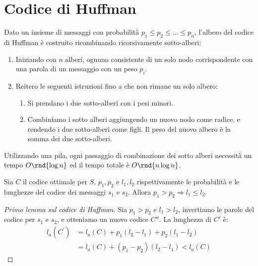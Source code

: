 \documentclass[\main/main.tex]{subfiles}
\begin{document}
\section{Codice di Huffman}
\begin{multicols}{2}
\begin{definition}
    Dato un insieme di messaggi con probabilità \(p_1 \leq p_2 \leq \ldots \leq p_n\), l'albero del codice di Huffman è costruito ricombinando ricorsivamente sotto-alberi:
    \begin{enumerate}
        \item Iniziando con \(n\) alberi, ognuno consistente di un solo nodo corrispondente con una parola di un messaggio con un peso \(p_i\).
        \item Reitero le seguenti istruzioni fino a che non rimane un solo albero:
        \begin{enumerate}
            \item Si prendano i due sotto-alberi con i pesi minori.
            \item Combiniamo i sotto alberi aggiungendo un nuovo nodo come radice, e rendendo i due sotto-alberi come figli. Il peso del nuovo albero è la somma dei due sotto-alberi.
        \end{enumerate}
    \end{enumerate}
\end{definition}
\begin{complexity}
    Utilizzando una pila, ogni passaggio di combinazione dei sotto alberi necessità un tempo \(O\rnd{\log n}\) ed il tempo totale è \(O\rnd{n \log n}\).
\end{complexity}
\begin{lemma}
    Sia \(C\) il codice ottimale per \(S\), \(p_1, p_2\) e \(l_1, l_2\) rispettivamente le probabilità e le lunghezze del codice dei messaggi \(s_1\) e \(s_2\). Allora \(p_1 > p_2 \Rightarrow l_1 \leq l_2\).
\end{lemma}
\begin{proof}[Primo lemma sul codice di Huffman]
    Sia \(p_1 > p_2\) e \(l_1>l_2\), invertiamo le parole del codice per \(s_1\) e \(s_2\), e otteniamo un nuovo codice \(C''\). La lunghezza di \(C'\) è:
    \begin{align*}
        l_{a}\left(C^{\prime}\right)&=l_{a}(C)+p_{1}\left(l_{2}-l_{1}\right)+p_{2}\left(l_{1}-l_{2}\right)\\
        &=l_{a}(C)+\left(p_{1}-p_{2}\right)\left(l_{2}-l_{1}\right)<l_{a}(C)

\end{align*}
\end{proof}
\end{multicols}
\end{document}
